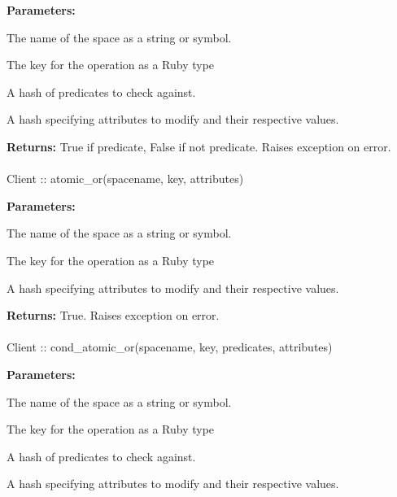 \noindent\textbf{Parameters:}
\begin{description}[labelindent=\widthof{{\code{predicates}}},leftmargin=*,noitemsep,nolistsep,align=right]
\item[\code{spacename}] The name of the space as a string or symbol.
\item[\code{key}] The key for the operation as a Ruby type
\item[\code{predicates}] A hash of predicates to check against.
\item[\code{attributes}] A hash specifying attributes to modify and their respective values.
\end{description}

\noindent\textbf{Returns:}
True if predicate, False if not predicate.  Raises exception on error.

\paragraph{}
\label{api:ruby:atomic_or}
\begin{ccode}
Client :: atomic_or(spacename, key, attributes)
\end{ccode}
\funcdesc 

\noindent\textbf{Parameters:}
\begin{description}[labelindent=\widthof{{\code{attributes}}},leftmargin=*,noitemsep,nolistsep,align=right]
\item[\code{spacename}] The name of the space as a string or symbol.
\item[\code{key}] The key for the operation as a Ruby type
\item[\code{attributes}] A hash specifying attributes to modify and their respective values.
\end{description}

\noindent\textbf{Returns:}
True.  Raises exception on error.

\paragraph{}
\label{api:ruby:cond_atomic_or}
\begin{ccode}
Client :: cond_atomic_or(spacename, key, predicates, attributes)
\end{ccode}
\funcdesc 

\noindent\textbf{Parameters:}
\begin{description}[labelindent=\widthof{{\code{predicates}}},leftmargin=*,noitemsep,nolistsep,align=right]
\item[\code{spacename}] The name of the space as a string or symbol.
\item[\code{key}] The key for the operation as a Ruby type
\item[\code{predicates}] A hash of predicates to check against.
\item[\code{attributes}] A hash specifying attributes to modify and their respective values.
\end{description}

